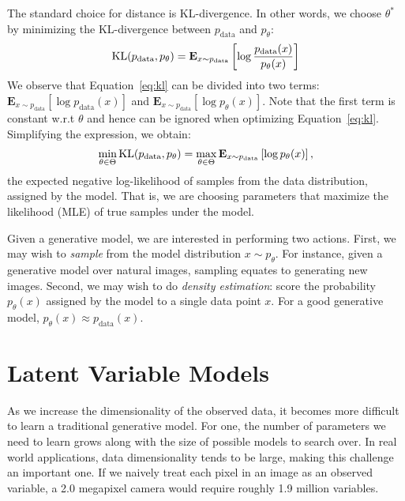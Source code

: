 The standard choice for distance is KL-divergence. In other words, we choose $\theta^*$ by minimizing the KL-divergence  between $p_{\text{data}}$ and $p_{\theta}$:
\begin{equation}
    \textup{KL}(p_{\text{data}}, p_{\theta}) = \mathbf{E}_{x \sim p_{\text{data}}}\left[ \log \frac{p_{\text{data}}(x)}{p_\theta(x)} \right] 
    \label{eq:kl}
\end{equation}
We observe that Equation~\ref{eq:kl} can be divided into two terms: $ \mathbf{E}_{x \sim p_{\text{data}}}\left[ \log p_{\text{data}}(x) \right]$ and $ \mathbf{E}_{x \sim p_{\text{data}}}\left[ \log p_{\theta}(x) \right]$. Note that the first term is constant w.r.t $\theta$ and hence can be ignored when optimizing Equation~\ref{eq:kl}. Simplifying the expression, we obtain: 
\begin{equation}
    \min_{\theta \in \Theta} \textup{KL}(p_{\text{data}}, p_{\theta}) = \max_{\theta \in \Theta} \mathbf{E}_{x \sim p_{\text{data}}}\left[\log p_\theta(x) \right],
    \label{eq:mle}
\end{equation}
the expected negative log-likelihood of samples from the data distribution, assigned by the model. That is, we are choosing parameters that maximize the likelihood (MLE) of true samples under the model.

Given a generative model, we are interested in performing two actions. First, we may wish to \textit{sample} from the model distribution $x \sim p_\theta$. For instance, given a generative model over natural images, sampling equates to generating new images. Second, we may wish to do \textit{density estimation}: score the probability $p_\theta(x)$ assigned by the model to a single data point $x$. For a good generative model, $p_\theta(x) \approx p_{\text{data}}(x)$.

\section{Latent Variable Models}

As we increase the dimensionality of the observed data, it becomes more difficult to learn a traditional generative model. For one, the number of parameters we need to learn grows along with the size of possible models to search over. In real world applications, data dimensionality tends to be large, making this challenge an important one. If we naively treat each pixel in an image as an observed variable, a 2.0 megapixel camera would require roughly 1.9 million variables. 

